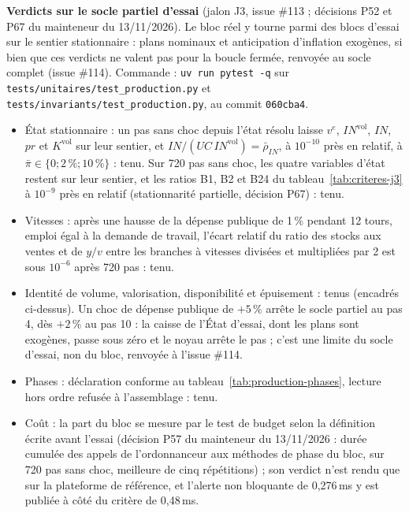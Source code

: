\documentclass[11pt,a4paper]{article}
\begin{document}
{\setlength{\emergencystretch}{3em}\textbf{Verdicts sur le socle partiel d'essai} (jalon J3, issue \#113 ; décisions P52 et P67 du mainteneur du 13/11/2026). Le bloc réel y tourne parmi des blocs d'essai sur le sentier stationnaire : plans nominaux et anticipation d'inflation exogènes, si bien que ces verdicts ne valent pas pour la boucle fermée, renvoyée au socle complet (issue \#114). Commande : \texttt{uv run pytest -q} sur \nolinkurl{tests/unitaires/test_production.py} et \nolinkurl{tests/invariants/test_production.py}, au commit \texttt{060cba4}.\par}
\begin{itemize}
\item État stationnaire : un pas sans choc depuis l'état résolu laisse $v^e$, $\mathit{IN}^{\mathrm{vol}}$, $\mathit{IN}$, $\mathit{pr}$ et $K^{\mathrm{vol}}$ sur leur sentier, et $\mathit{IN}/(\mathit{UC}\,\mathit{IN}^{\mathrm{vol}}) = \bar\rho_{\mathit{IN}}$, à $10^{-10}$ près en relatif, à $\bar\pi \in \{0 ; 2\,\% ; 10\,\%\}$ : tenu. Sur 720 pas sans choc, les quatre variables d'état restent sur leur sentier, et les ratios B1, B2 et B24 du tableau~\ref{tab:criteres-j3} à $10^{-9}$ près en relatif (stationnarité partielle, décision P67) : tenu.
\item Vitesses : après une hausse de la dépense publique de 1\,\% pendant 12 tours, emploi égal à la demande de travail, l'écart relatif du ratio des stocks aux ventes et de $y/v$ entre les branches à vitesses divisées et multipliées par 2 est sous $10^{-6}$ après 720 pas : tenu.
\item Identité de volume, valorisation, disponibilité et épuisement : tenus (encadrés ci-dessus). Un choc de dépense publique de $+5\,\%$ arrête le socle partiel au pas 4, dès $+2\,\%$ au pas 10 : la caisse de l'État d'essai, dont les plans sont exogènes, passe sous zéro et le noyau arrête le pas ; c'est une limite du socle d'essai, non du bloc, renvoyée à l'issue \#114.
\item Phases : déclaration conforme au tableau~\ref{tab:production-phases}, lecture hors ordre refusée à l'assemblage : tenu.
\item Coût : la part du bloc se mesure par le test de budget selon la définition écrite avant l'essai (décision P57 du mainteneur du 13/11/2026 : durée cumulée des appels de l'ordonnanceur aux méthodes de phase du bloc, sur 720 pas sans choc, meilleure de cinq répétitions) ; son verdict n'est rendu que sur la plateforme de référence, et l'alerte non bloquante de 0,276\,ms y est publiée à côté du critère de 0,48\,ms.
\end{itemize}
\end{document}
